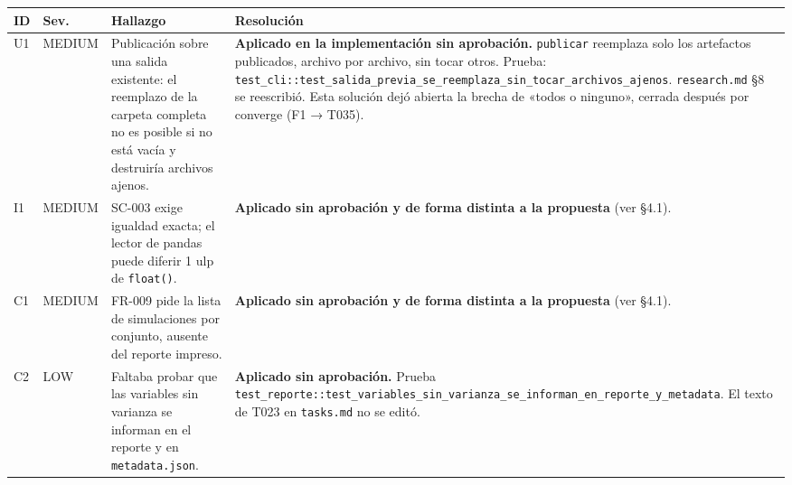 \documentclass[12pt,a4paper]{article}
\newcounter{none} %
\newenvironment{documentogenerado}[2]{%
  \def\doccomando{#1}\def\docruta{#2}%
  \par\begingroup\small\setstretch{1.15}\sloppy%
}{\endgroup\par\medskip}
\begin{document}
\begin{documentogenerado}{/speckit-analyze + /speckit-converge}{specs\slash 001-preparacion-datos\slash auditoria.md}
{\def\LTcaptype{none} %
\begin{longtable}[]{@{}
  >{\raggedright\arraybackslash\hspace{0pt}}p{}
  >{\raggedright\arraybackslash\hspace{0pt}}p{}
  >{\raggedright\arraybackslash\hspace{0pt}}p{}
  >{\raggedright\arraybackslash\hspace{0pt}}p{}@{}}
\toprule\noalign{}
\begin{minipage}[b]{\linewidth}\raggedright
ID
\end{minipage} & \begin{minipage}[b]{\linewidth}\raggedright
Sev.
\end{minipage} & \begin{minipage}[b]{\linewidth}\raggedright
Hallazgo
\end{minipage} & \begin{minipage}[b]{\linewidth}\raggedright
Resolución
\end{minipage} \\
\midrule\noalign{}
\endhead
\bottomrule\noalign{}
\endlastfoot
U1 & MEDIUM & Publicación sobre una salida existente: el reemplazo de la carpeta completa no es posible si no está vacía y destruiría archivos ajenos. & \textbf{Aplicado en la implementación sin aprobación.} \texttt{publicar} reemplaza solo los artefactos publicados, archivo por archivo, sin tocar otros. Prueba: \texttt{test\_\allowbreak{}cli::test\_\allowbreak{}salida\_\allowbreak{}previa\_\allowbreak{}se\_\allowbreak{}reemplaza\_\allowbreak{}sin\_\allowbreak{}tocar\_\allowbreak{}archivos\_\allowbreak{}ajenos}. \texttt{research.\allowbreak{}md} §8 se reescribió. Esta solución dejó abierta la brecha de «todos o ninguno», cerrada después por converge (F1 → T035). \\
I1 & MEDIUM & SC-003 exige igualdad exacta; el lector de pandas puede diferir 1 ulp de \texttt{float()}. & \textbf{Aplicado sin aprobación y de forma distinta a la propuesta} (ver §4.1). \\
C1 & MEDIUM & FR-009 pide la lista de simulaciones por conjunto, ausente del reporte impreso. & \textbf{Aplicado sin aprobación y de forma distinta a la propuesta} (ver §4.1). \\
C2 & LOW & Faltaba probar que las variables sin varianza se informan en el reporte y en \texttt{metadata.\allowbreak{}json}. & \textbf{Aplicado sin aprobación.} Prueba \texttt{test\_\allowbreak{}reporte::test\_\allowbreak{}variables\_\allowbreak{}sin\_\allowbreak{}varianza\_\allowbreak{}se\_\allowbreak{}informan\_\allowbreak{}en\_\allowbreak{}reporte\_\allowbreak{}y\_\allowbreak{}metadata}. El texto de T023 en \texttt{tasks.\allowbreak{}md} no se editó. \\

\end{longtable}}
\end{documentogenerado}
\end{document}
